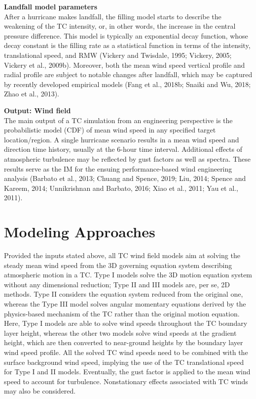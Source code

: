 \noindent\textbf{Landfall model parameters} \\After a hurricane makes landfall, the filling model starts to describe the weakening of the TC intensity, or, in other words, the increase in the central pressure difference. This model is typically an exponential decay function, whose decay constant is the filling rate as a statistical function in terms of the intensity, translational speed, and RMW (Vickery and Twisdale, 1995; Vickery, 2005; Vickery et al., 2009b). Moreover, both the mean wind speed vertical profile and radial profile are subject to notable changes after landfall, which may be captured by recently developed empirical models (Fang et al., 2018b; Snaiki and Wu, 2018; Zhao et al., 2013). 
\newline

\noindent\textbf{Output: Wind field} \\The main output of a TC simulation from an engineering perspective is the probabilistic model (CDF) of mean wind speed in any specified target location/region. A single hurricane scenario results in a mean wind speed and direction time history, usually at the 6-hour time interval. Additional effects of atmospheric turbulence may be reflected by gust factors as well as spectra. These results serve as the IM for the ensuing performance-based wind engineering analysis (Barbato et al., 2013; Chuang and Spence, 2019; Liu, 2014; Spence and Kareem, 2014; Unnikrishnan and Barbato, 2016; Xiao et al., 2011; Yau et al., 2011).

\section{Modeling Approaches}
\label{sec:storm_wind_methods}

Provided the inputs stated above, all TC wind field models aim at solving the steady mean wind speed from the 3D governing equation system describing atmospheric motion in a TC. Type I models solve the 3D motion equation system without any dimensional reduction; Type II and III models are, per se, 2D methods. Type II considers the equation system reduced from the original one, whereas the Type III model solves angular momentary equations derived by the physics-based mechanism of the TC rather than the original motion equation. Here, Type I models are able to solve wind speeds throughout the TC boundary layer height, whereas the other two models solve wind speeds at the gradient height, which are then converted to near-ground heights by the boundary layer wind speed profile. All the solved TC wind speeds need to be combined with the surface background wind speed, implying the use of the TC translational speed for Type I and II models. Eventually, the gust factor is applied to the mean wind speed to account for turbulence. Nonstationary effects associated with TC winds may also be considered.
\newline

